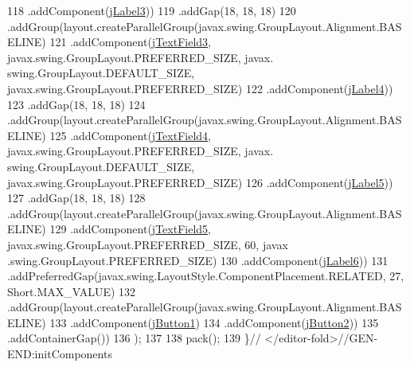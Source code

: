 \begin{DoxyCode}
118                     .addComponent(\mbox{\hyperlink{class_interfaz_package_1_1_alta_lectores_a8540271f20afc2b5d9e7b8ece4ec5e93}{jLabel3}}))
119                 .addGap(18, 18, 18)
120                 .addGroup(layout.createParallelGroup(javax.swing.GroupLayout.Alignment.BASELINE)
121                     .addComponent(\mbox{\hyperlink{class_interfaz_package_1_1_alta_lectores_a1043b2ff62e3dcae79fb652d7891a131}{jTextField3}}, javax.swing.GroupLayout.PREFERRED\_SIZE, javax.
      swing.GroupLayout.DEFAULT\_SIZE, javax.swing.GroupLayout.PREFERRED\_SIZE)
122                     .addComponent(\mbox{\hyperlink{class_interfaz_package_1_1_alta_lectores_a39c95238a43795188e9eeeafa177e0c8}{jLabel4}}))
123                 .addGap(18, 18, 18)
124                 .addGroup(layout.createParallelGroup(javax.swing.GroupLayout.Alignment.BASELINE)
125                     .addComponent(\mbox{\hyperlink{class_interfaz_package_1_1_alta_lectores_a933106873681982ae326743f58efd3d5}{jTextField4}}, javax.swing.GroupLayout.PREFERRED\_SIZE, javax.
      swing.GroupLayout.DEFAULT\_SIZE, javax.swing.GroupLayout.PREFERRED\_SIZE)
126                     .addComponent(\mbox{\hyperlink{class_interfaz_package_1_1_alta_lectores_a59070bf77faf3741fbd2648451cd3075}{jLabel5}}))
127                 .addGap(18, 18, 18)
128                 .addGroup(layout.createParallelGroup(javax.swing.GroupLayout.Alignment.BASELINE)
129                     .addComponent(\mbox{\hyperlink{class_interfaz_package_1_1_alta_lectores_a8486f57ea492fe17d177c837d057d73e}{jTextField5}}, javax.swing.GroupLayout.PREFERRED\_SIZE, 60, javax
      .swing.GroupLayout.PREFERRED\_SIZE)
130                     .addComponent(\mbox{\hyperlink{class_interfaz_package_1_1_alta_lectores_a8af45e7375fe9c6f739b4d5bc09bb983}{jLabel6}}))
131                 .addPreferredGap(javax.swing.LayoutStyle.ComponentPlacement.RELATED, 27, Short.MAX\_VALUE)
132                 .addGroup(layout.createParallelGroup(javax.swing.GroupLayout.Alignment.BASELINE)
133                     .addComponent(\mbox{\hyperlink{class_interfaz_package_1_1_alta_lectores_a022b628c2a9a98d3d2e05f2776bad642}{jButton1}})
134                     .addComponent(\mbox{\hyperlink{class_interfaz_package_1_1_alta_lectores_a8e96fe07c387d4a3215d30dc25442f6a}{jButton2}}))
135                 .addContainerGap())
136         );
137 
138         pack();
139     \}\textcolor{comment}{// </editor-fold>//GEN-END:initComponents}
\end{DoxyCode}
\mbox{\label{class_interfaz_package_1_1_alta_lectores_af6d6d0a98b0748f84e8cf4bf8ef3d153}} 
